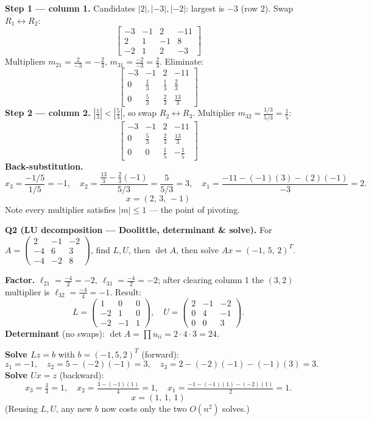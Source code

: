 \documentclass[10pt,a4paper]{article}
\newenvironment{sol}%
  {\par\vspace{2pt}\begingroup\setlength{\fboxsep}{5pt}%
   \begin{lrbox}{\sbx}\begin{minipage}{\dimexpr\linewidth-2\fboxsep\relax}}%
  {\end{minipage}\end{lrbox}\colorbox{solbg}{\usebox{\sbx}}\endgroup\par\vspace{4pt}}
\begin{document}
\begin{sol}
\textbf{Step 1 — column 1.} Candidates $|2|,|-3|,|-2|$: largest is $-3$ (row 2). Swap $R_1\leftrightarrow R_2$:
\[ \left[\begin{array}{ccc|c} -3&-1&2&-11\\ 2&1&-1&8\\ -2&1&2&-3 \end{array}\right] \]
Multipliers $m_{21}=\tfrac{2}{-3}=-\tfrac23$, $m_{31}=\tfrac{-2}{-3}=\tfrac23$. Eliminate:
\[ \left[\begin{array}{ccc|c} -3&-1&2&-11\\ 0&\tfrac13&\tfrac13&\tfrac23\\ 0&\tfrac53&\tfrac23&\tfrac{13}{3} \end{array}\right] \]
\textbf{Step 2 — column 2.} $|\tfrac13|<|\tfrac53|$, so swap $R_2\leftrightarrow R_3$. Multiplier $m_{32}=\tfrac{1/3}{5/3}=\tfrac15$:
\[ \left[\begin{array}{ccc|c} -3&-1&2&-11\\ 0&\tfrac53&\tfrac23&\tfrac{13}{3}\\ 0&0&\tfrac15&-\tfrac15 \end{array}\right] \]
\textbf{Back-substitution.}
\[ x_3=\frac{-1/5}{1/5}=-1,\quad x_2=\frac{\tfrac{13}{3}-\tfrac23(-1)}{5/3}=\frac{5}{5/3}=3,\quad x_1=\frac{-11-(-1)(3)-(2)(-1)}{-3}=2. \]
\[ \boxed{x=(2,\,3,\,-1)} \] Note every multiplier satisfies $|m|\le1$ — the point of pivoting.
\end{sol}

\textbf{Q2 (LU decomposition — Doolittle, determinant \& solve).} For
$A=\begin{pmatrix}2&-1&-2\\ -4&6&3\\ -4&-2&8\end{pmatrix}$, find $L,U$, then $\det A$, then solve $Ax=(-1,\,5,\,2)^T$.

\begin{sol}
\textbf{Factor.} $\ell_{21}=\tfrac{-4}{2}=-2,\ \ell_{31}=\tfrac{-4}{2}=-2$; after clearing column 1 the $(3,2)$ multiplier is $\ell_{32}=\tfrac{-4}{4}=-1$. Result:
\[ L=\begin{pmatrix}1&0&0\\ -2&1&0\\ -2&-1&1\end{pmatrix},\quad U=\begin{pmatrix}2&-1&-2\\ 0&4&-1\\ 0&0&3\end{pmatrix}. \]
\textbf{Determinant} (no swaps): $\det A=\prod u_{ii}=2\cdot4\cdot3=\boxed{24}.$

\textbf{Solve $Lz=b$} with $b=(-1,5,2)^T$ (forward):
\[ z_1=-1,\quad z_2=5-(-2)(-1)=3,\quad z_3=2-(-2)(-1)-(-1)(3)=3. \]
\textbf{Solve $Ux=z$} (backward):
\[ x_3=\tfrac{3}{3}=1,\quad x_2=\tfrac{3-(-1)(1)}{4}=1,\quad x_1=\tfrac{-1-(-1)(1)-(-2)(1)}{2}=1. \]
\[ \boxed{x=(1,\,1,\,1)} \] (Reusing $L,U$, any new $b$ now costs only the two $O(n^2)$ solves.)
\end{sol}
\end{document}
